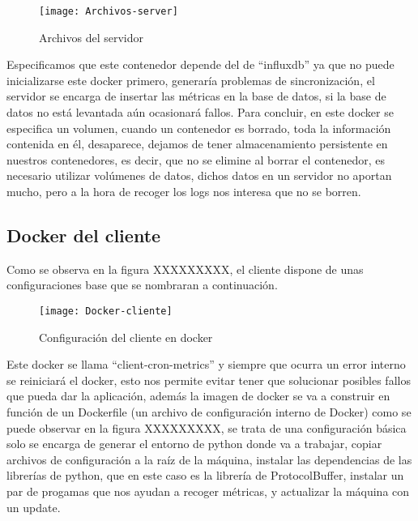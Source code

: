 \documentclass[ spanish, a4paper, 12pt, oneside]{report}
\begin{document}
\begin{figure}[!h]
   \centering
   \texttt{[image: Archivos-server]}\\
      \caption{\label{fig: Archivos del servidor} Archivos del servidor}
\end{figure}

Especificamos que este contenedor depende del de ``influxdb'' ya que no puede inicializarse este docker primero, generaría problemas de sincronización, el servidor se encarga de insertar las métricas en la base de datos, si la base de datos no está levantada aún ocasionará fallos. 
Para concluir, en este docker se especifica un volumen, cuando un contenedor es borrado, toda la información contenida en él, desaparece, dejamos de tener almacenamiento persistente en nuestros contenedores, es decir, que no se elimine al borrar el contenedor, es necesario utilizar volúmenes de datos, 
dichos datos en un servidor no aportan mucho, pero a la hora de recoger los logs nos interesa que no se borren.\\

\subsection{Docker del cliente}
Como se observa en la figura XXXXXXXXX, el cliente dispone de unas configuraciones base que se nombraran a continuación.\\

\begin{figure}[!h]
   \centering
   \texttt{[image: Docker-cliente]}\\
      \caption{\label{fig: Configuración del cliente en docker} Configuración del cliente en docker}
\end{figure}

Este docker se llama ``client-cron-metrics'' y siempre que ocurra un error interno se reiniciará el docker, esto nos permite evitar 
tener que solucionar posibles fallos que pueda dar la aplicación, además la imagen de docker se va a construir en función de un Dockerfile (un archivo de configuración interno de Docker) como se puede observar en la figura XXXXXXXXX, se trata de una configuración básica 
solo se encarga de generar el entorno de python donde va a trabajar, copiar archivos de configuración a la raíz de la máquina, instalar las dependencias de las librerías de python, que en este caso es la librería de ProtocolBuffer, instalar un par de progamas que nos ayudan a recoger métricas, y actualizar 
la máquina con un update. \\
\end{document}
